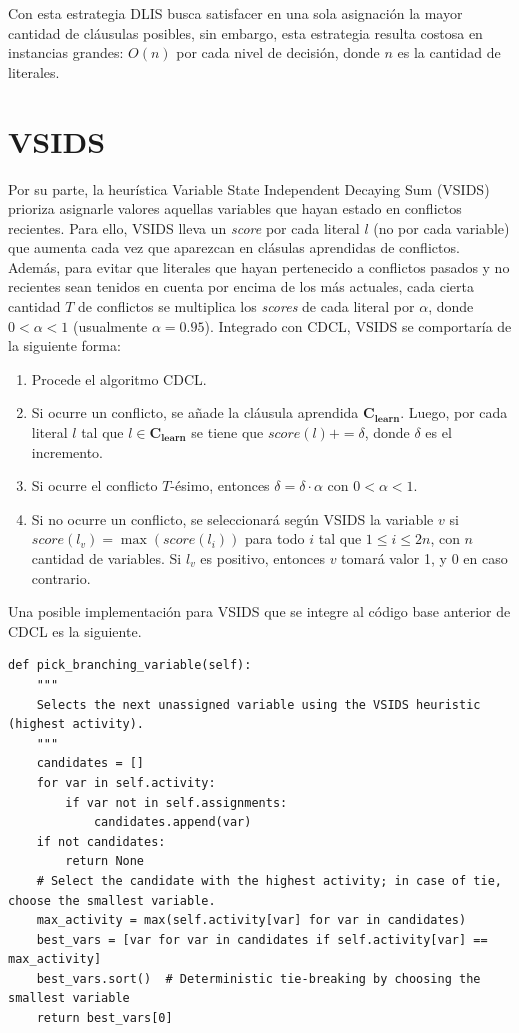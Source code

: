 Con esta estrategia DLIS busca satisfacer en una sola asignación la mayor cantidad de cláusulas posibles, sin embargo, esta estrategia resulta costosa en instancias grandes: $O(n)$ por cada nivel de decisión, donde $n$ es la cantidad de literales.

\section{VSIDS}
Por su parte, la heurística Variable State Independent Decaying Sum (VSIDS) prioriza asignarle valores aquellas variables que hayan estado en conflictos recientes. Para ello, VSIDS lleva un \textit{score} por cada literal $l$ (no por cada variable) que aumenta cada vez que aparezcan en clásulas aprendidas de conflictos. Además, para evitar que literales que hayan pertenecido a conflictos pasados y no recientes sean tenidos en cuenta por encima de los más actuales, cada cierta cantidad $T$ de conflictos se multiplica los \textit{scores} de cada literal por $\alpha$, donde $0 < \alpha < 1$ (usualmente $\alpha = 0.95$). Integrado con CDCL, VSIDS se comportaría de la siguiente forma:
\begin{enumerate}
    \item Procede el algoritmo CDCL.
    \item Si ocurre un conflicto, se añade la cláusula aprendida $\mathbf{C_{learn}}$. Luego, por cada literal $l$ tal que $l \in \mathbf{C_{learn}}$ se tiene que $score(l) += \delta$, donde $\delta$ es el incremento.
    \item Si ocurre el conflicto $T$-ésimo, entonces $\delta = \delta \cdot \alpha$ con $0 < \alpha < 1$.
    \item Si no ocurre un conflicto, se seleccionará según VSIDS la variable $v$ si $score(l_v) = \max(score(l_i))$ para todo $i$ tal que $1 \leq i \leq 2n$, con $n$ cantidad de variables. Si $l_v$ es positivo, entonces $v$ tomará valor 1, y 0 en caso contrario.
\end{enumerate}

Una posible implementación para VSIDS que se integre al código base anterior de CDCL es la siguiente.

\begin{lstlisting}
def pick_branching_variable(self):
    """
    Selects the next unassigned variable using the VSIDS heuristic (highest activity).
    """
    candidates = []
    for var in self.activity:
        if var not in self.assignments:
            candidates.append(var)
    if not candidates:
        return None
    # Select the candidate with the highest activity; in case of tie, choose the smallest variable.
    max_activity = max(self.activity[var] for var in candidates)
    best_vars = [var for var in candidates if self.activity[var] == max_activity]
    best_vars.sort()  # Deterministic tie-breaking by choosing the smallest variable
    return best_vars[0]
\end{lstlisting}

